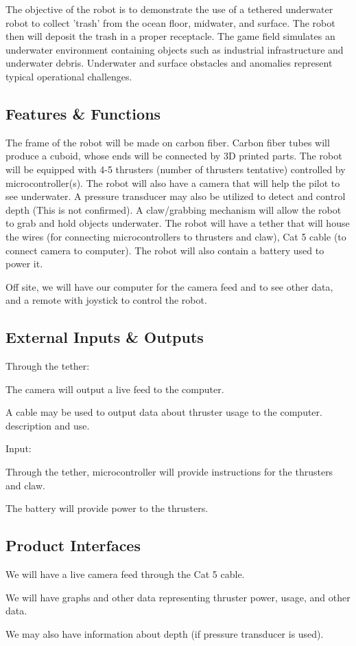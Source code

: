 The objective of the robot is to demonstrate the use of a tethered underwater robot to collect 'trash' from the ocean floor, midwater, and surface. The robot then will deposit the trash in a proper receptacle. The game field simulates an underwater environment containing objects such as industrial infrastructure and underwater debris. Underwater and surface obstacles and anomalies represent typical operational challenges. 

\subsection{Features \& Functions}
The frame of the robot will be made on carbon fiber. Carbon fiber tubes will produce a cuboid, whose ends will be connected by 3D printed parts. The robot will be equipped with 4-5 thrusters (number of thrusters tentative) controlled by microcontroller(s). The robot will also have a camera that will help the pilot to see underwater. A pressure transducer may also be utilized to detect and control depth (This is not confirmed). A claw/grabbing mechanism will allow the robot to grab and hold objects underwater. The robot will have a tether that will house the wires (for connecting microcontrollers to thrusters and claw), Cat 5 cable (to connect camera to computer). The robot will also contain a battery used to power it. 

Off site, we will have our computer for the camera feed and to see other data, and a remote with joystick to control the robot. 

\subsection{External Inputs \& Outputs}
Through the tether: 

The camera will output a live feed to the computer. 

A cable may be used to output data about thruster usage to the computer.  description and use.

Input: 

Through the tether, microcontroller will provide instructions for the thrusters and claw. 

The battery will provide power to the thrusters. 

\subsection{Product Interfaces}
We will have a live camera feed through the Cat 5 cable. 

We will have graphs and other data representing thruster power, usage, and other data. 

We may also have information about depth (if pressure transducer is used). 
